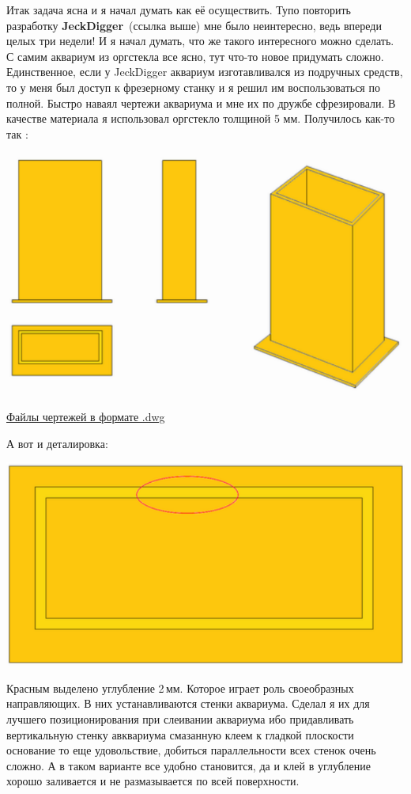 \documentclass{magazine}
\begin{document}
{Итак задача ясна и я начал думать как её осуществить. Тупо повторить разработку
\textbf{JeckDigger}\ (ссылка выше) мне было неинтересно, ведь впереди целых три
недели! И я начал думать, что же такого интересного можно сделать.
С самим аквариум из оргстекла все ясно, тут что-то новое придумать сложно.
Единственное, если у JeckDigger аквариум изготавливался из подручных средств, то
у меня был доступ к фрезерному станку и я решил им воспользоваться по полной.
Быстро наваял чертежи аквариума и мне их по дружбе сфрезировали. В качестве
материала я использовал оргстекло толщиной 5 мм. Получилось как-то так :

\noindent\includegraphics[width=\columnwidth]{fig/00/smit/ee000017.png}

\href{}{Файлы чертежей в формате .dwg}

А вот и деталировка:

\noindent\includegraphics[width=\columnwidth]{fig/00/smit/ee000018.png}

Красным выделено углубление 2\,мм. Которое играет роль своеобразных
направляющих. В них устанавливаются стенки аквариума. Сделал я их для лучшего
позиционирования при слеивании аквариума ибо придавливать вертикальную стенку
авквариума смазанную клеем к гладкой плоскости основание то еще удовольствие,
добиться параллельности всех стенок очень сложно. А в таком варианте все удобно
становится, да и клей в углубление хорошо заливается и не размазывается по всей
поверхности.

}
\end{document}
